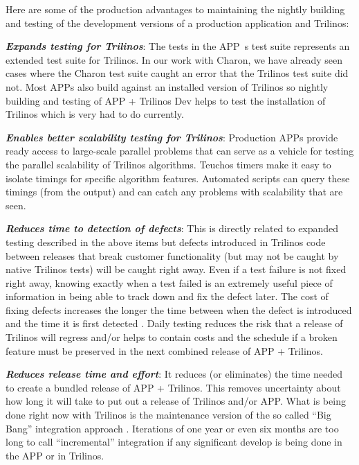 \documentclass[pdf,ps2pdf,11pt]{SANDreport}
\begin{document}
Here are some of the production advantages to maintaining the nightly building
and testing of the development versions of a production application and
Trilinos:

{}\textit{\textbf{Expands testing for Trilinos}}: The tests in the APP~s test
suite represents an extended test suite for Trilinos.  In our work with
Charon, we have already seen cases where the Charon test suite caught an error
that the Trilinos test suite did not.  Most APPs also build against an
installed version of Trilinos so nightly building and testing of APP +
Trilinos Dev helps to test the installation of Trilinos which is very had to
do currently.

{}\textit{\textbf{Enables better scalability testing for Trilinos}}: Production
APPs provide ready access to large-scale parallel problems that can serve as a
vehicle for testing the parallel scalability of Trilinos algorithms.  Teuchos
timers make it easy to isolate timings for specific algorithm features.
Automated scripts can query these timings (from the output) and can catch any
problems with scalability that are seen.

{}\textit{\textbf{Reduces time to detection of defects}}: This is directly related
to expanded testing described in the above items but defects introduced in
Trilinos code between releases that break customer functionality (but may not
be caught by native Trilinos tests) will be caught right away.  Even if a test
failure is not fixed right away, knowing exactly when a test failed is an
extremely useful piece of information in being able to track down and fix the
defect later.  The cost of fixing defects increases the longer the time
between when the defect is introduced and the time it is first detected
{}\cite{book:code-complete-2}.  Daily testing reduces the risk that a release
of Trilinos will regress and/or helps to contain costs and the schedule if a
broken feature must be preserved in the next combined release of APP +
Trilinos.

{}\textit{\textbf{Reduces release time and effort}}: It reduces (or eliminates)
the time needed to create a bundled release of APP + Trilinos.  This removes
uncertainty about how long it will take to put out a release of Trilinos
and/or APP.  What is being done right now with Trilinos is the maintenance
version of the so called ``Big Bang'' integration approach
{}\cite{book:code-complete-2}.  Iterations of one year or even six months are
too long to call ``incremental'' integration if any significant develop is
being done in the APP or in Trilinos.
\end{document}
